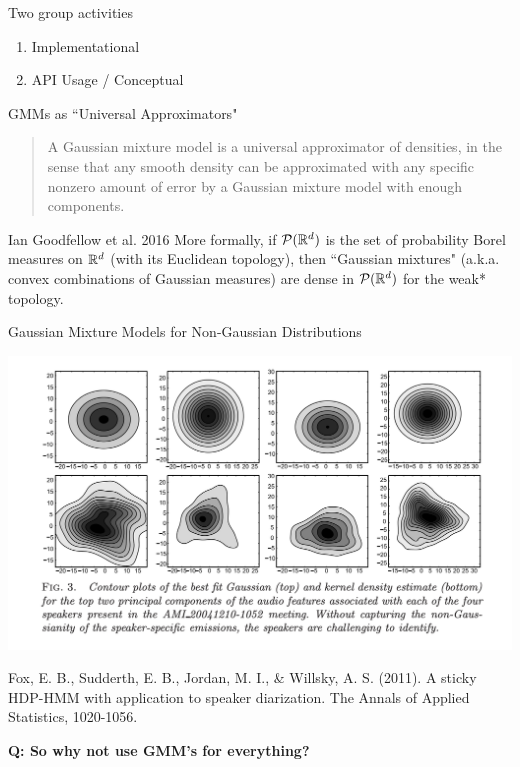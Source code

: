 \documentclass[10pt]{beamer}
\begin{document}
\begin{frame}{Two group activities}
\begin{enumerate}
\item Implementational
\item API Usage / Conceptual
\end{enumerate}

\end{frame}


\begin{frame}{GMMs as ``Universal Approximators"}

\begin{quote}
A Gaussian mixture model is a universal approximator of densities, in the sense that any smooth density can be approximated with any speciﬁc nonzero amount of error by a Gaussian mixture model with enough components.
\end{quote}

\hfill \tiny Ian Goodfellow et al. 2016
\vfill
\tiny More formally, if $\mathcal{P}(\mathbb{R}^d)$  is the set of probability Borel measures on $\mathbb{R}^d$ (with its Euclidean topology), then ``Gaussian mixtures" (a.k.a. convex combinations of Gaussian measures) are dense in $\mathcal{P}(\mathbb{R}^d)$ for the  weak*  topology.

\end{frame}

\begin{frame}{Gaussian Mixture Models for Non-Gaussian Distributions}

\begin{center}
\includegraphics[width=.8\textwidth]{images/speaker_diarization_contours}
\end{center}

\tiny Fox, E. B., Sudderth, E. B., Jordan, M. I., \& Willsky, A. S. (2011). A sticky HDP-HMM with application to speaker diarization. The Annals of Applied Statistics, 1020-1056.

\vfill \vfill \vfill
\tiny \bf{Q:} So why not use GMM's for everything?

\end{frame}
\end{document}
